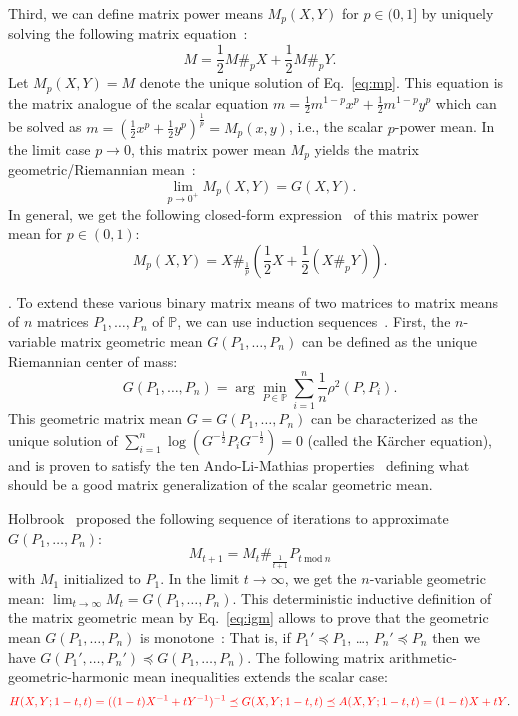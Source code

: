 \documentclass{article}
\def\correction#1{{\color{red}{#1}}}
\def\mod{\mathrm{mod}}
\def\bbP{\mathbb{P}}
\begin{document}
Third, we can define matrix power means $M_p(X,Y)$ for $p\in (0,1]$  
by uniquely solving the following matrix equation~\cite{lim2012matrix}:
\begin{equation}\label{eq:mp}
M=\frac{1}{2} M\#_p X + \frac{1}{2}  M\#_p Y.
\end{equation}
Let $M_p(X,Y)=M$ denote the unique solution of Eq.~\ref{eq:mp}.
This equation is the matrix analogue of the scalar equation $m=\frac{1}{2} m^{1-p}x^p + \frac{1}{2} m^{1-p}y^p$  which can be solved as 
$m=\left(\frac{1}{2}x^p+\frac{1}{2}y^p\right)^{\frac{1}{p}}=M_p(x,y)$, i.e., the scalar $p$-power mean.
In the limit case $p\rightarrow 0$, this matrix power mean $M_p$ yields the matrix geometric/Riemannian mean~\cite{lim2012matrix}: 
$$
\lim_{p\rightarrow 0^+} M_p(X,Y)=G(X,Y). 
$$
In general, we get the following closed-form expression~\cite{lim2012matrix} of  this matrix power mean for $p\in (0,1)$:
$$
M_p(X,Y)= X \#_{\frac{1}{p}}\left (\frac{1}{2}X+ \frac{1}{2}(X \#_p Y)\right).
$$

\vskip 0.3cm
.
To extend these various binary matrix means of two matrices  to matrix means of $n$ matrices $P_1,\ldots, P_n$ of $\bbP$, we can use induction sequences~\cite{RecursiveFrechetMeanNPC-2016}.
First, the $n$-variable matrix geometric mean $G(P_1,\ldots, P_n)$ can be defined as the unique Riemannian center of mass:
$$
G(P_1,\ldots, P_n)= \arg\min_{P\in\bbP} \sum_{i=1}^n \frac{1}{n}\rho^2(P,P_i).
$$
This geometric matrix mean $G=G(P_1,\ldots, P_n)$ can be characterized as the unique solution of 
$\sum_{i=1}^n \log\left(G^{-\frac{1}{2}}P_iG^{-\frac{1}{2}}\right)=0$ (called the K\"archer equation), and is proven to satisfy the ten Ando-Li-Mathias properties~\cite{ALM-2004} defining what should be a good matrix generalization of the scalar geometric mean.

Holbrook~\cite{holbrook2012no} proposed the following sequence of iterations to approximate  $G(P_1,\ldots, P_n)$:
\begin{equation}\label{eq:igm}
M_{t+1}=M_t \#_{\frac{1}{t+1}} P_{t\ \mod\ n}
\end{equation}
with $M_1$ initialized to $P_1$.
In the limit $t\rightarrow\infty$, we get the $n$-variable geometric mean: $\lim_{t\rightarrow\infty} M_t=G(P_1,\ldots,P_n)$.
This deterministic inductive definition of the matrix geometric mean by Eq.~\ref{eq:igm} allows to prove that 
the geometric mean $G(P_1,\ldots,P_n)$ is monotone~\cite{holbrook2012no}:
That is, if $P_1'\preceq P_1$, \ldots, $P_n'\preceq P_n$ then we have
$G(P_1',\ldots,P_n')\preceq G(P_1,\ldots,P_n)$.
The following matrix  arithmetic-geometric-harmonic mean inequalities extends the scalar case: 
$$
\correction{H(X,Y;1-t,t)=((1-t)X^{-1}+tY^{-1})^{-1} \preceq G(X,Y;1-t,t) \preceq A(X,Y;1-t,t)=(1-t)X+tY}.
$$
 
\end{document}
